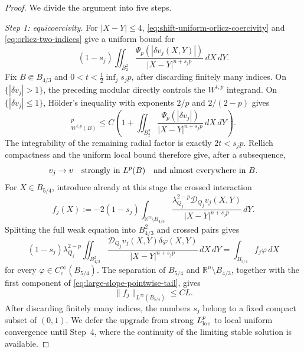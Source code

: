 \documentclass[11pt,reqno]{amsart}
\numberwithin{equation}{section}
\newcommand{\R}{\mathbb R}
\newcommand{\dd}{\,d}
\theoremstyle{remark}
\begin{document}
\begin{proof}
We divide the argument into five steps.

\emph{Step 1: equicoercivity.}
For \(|X-Y|\le4\), \eqref{eq:shift-uniform-orlicz-coercivity} and
\eqref{eq:orlicz-two-indices} give a uniform bound for
\[
 (1-s_j)\iint_{B_2^2}
 \frac{\Psi_p(|\delta v_j(X,Y)|)}
 {|X-Y|^{n+s_jp}}\dd X\!\dd Y.
\]
Fix \(B\Subset B_{4/3}\) and
\(0<t<\frac12\inf_js_jp\), after discarding finitely many indices.
On \(\{|\delta v_j|>1\}\), the preceding modular directly controls the
\(W^{t,p}\) integrand.  On \(\{|\delta v_j|\le1\}\), H\"older's
inequality with exponents \(2/p\) and \(2/(2-p)\) gives
\begin{equation*}
 [v_j]_{W^{t,p}(B)}^p
 \le C\left(1+
 \iint_{B_2^2}
 \frac{\Psi_p(|\delta v_j|)}{|X-Y|^{n+s_jp}}
 \dd X\!\dd Y\right).
\end{equation*}
The integrability of the remaining radial factor is exactly
\(2t<s_jp\).  Rellich compactness and the uniform local bound therefore
give, after a subsequence,
\begin{equation}
 v_j\to v\quad\hbox{strongly in }L^p(B)
 \quad\hbox{and almost everywhere in }B.
 \label{eq:infinite-slope-strong-compactness}
\end{equation}
For \(X\in B_{5/4}\), introduce already at this stage the crossed
interaction
\begin{equation}
 f_j(X):=-2(1-s_j)\int_{\R^n\setminus B_{4/3}}
 \frac{\lambda_{Q_j}^{2-p}\mathcal D_{Q_j}v_j(X,Y)}
 {|X-Y|^{n+s_jp}}\dd Y.
 \label{eq:large-slope-crossed-source}
\end{equation}
Splitting the full weak equation into \(B_{4/3}^2\) and crossed pairs
gives
\begin{equation*}
 (1-s_j)\lambda_{Q_j}^{2-p}
 \iint_{B_{4/3}^2}
 \frac{\mathcal D_{Q_j}v_j(X,Y)\delta\varphi(X,Y)}
 {|X-Y|^{n+s_jp}}\dd X\!\dd Y
 =\int_{B_{5/4}}f_j\varphi\dd X
\end{equation*}
for every \(\varphi\in C_c^\infty(B_{5/4})\).  The separation of
\(B_{5/4}\) and \(\R^n\setminus B_{4/3}\), together with the first
component of \eqref{eq:large-slope-pointwise-tail}, gives
\begin{equation}
 \|f_j\|_{L^\infty(B_{5/4})}\le CL.
 \label{eq:large-slope-crossed-source-bound}
\end{equation}
After discarding finitely many indices, the numbers \(s_j\) belong to a
fixed compact subset of \((0,1)\).  We defer the upgrade from strong
\(L^p_{\rm loc}\) to local uniform convergence until Step~4, where the
continuity of the limiting stable solution is available.


\end{proof}
\end{document}
